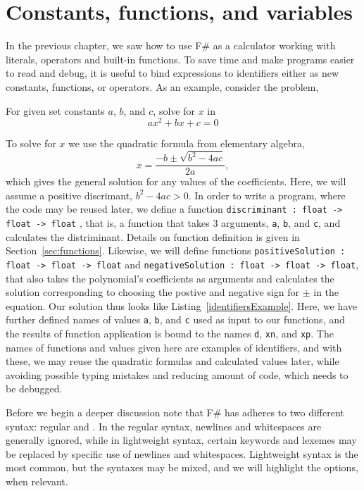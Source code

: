 \chapter{Constants, functions, and variables}
\label{chap:let}
%
In the previous chapter, we saw how to use F\# as a calculator working with literals, operators and built-in functions. To save time and make programs easier to read and debug, it is useful to bind expressions to identifiers either as new constants, functions, or operators. As an example, consider the problem,
\begin{problem}
  For given set constants $a$, $b$, and $c$, solve for $x$ in
  \begin{equation}
  a x^2+bx+c = 0
\end{equation}
\end{problem}
To solve for $x$ we use the quadratic formula from elementary algebra,
\begin{equation}
  x = \frac{-b\pm\sqrt{b^2-4ac}}{2a},
\end{equation}
which gives the general solution for any values of the coefficients. Here, we will assume a positive discrimant, $b^2-4ac>0$. In order to write a program, where the code may be reused later, we define a function \mbox{\lstinline!discriminant : float -> float -> float!}  , that is, a function that takes 3 arguments, \lstinline!a!, \lstinline!b!, and \lstinline!c!, and calculates the distriminant. Details on function definition is given in Section~\ref{sec:functions}. Likewise, we will define functions \mbox{\lstinline!positiveSolution : float -> float -> float!} and \mbox{\lstinline!negativeSolution : float -> float -> float!}, that also takes the polynomial's coefficients as arguments and calculates the solution corresponding to choosing the postive and negative sign for $\pm$ in the equation. Our solution thus looks like Listing~\ref{identifiersExample}.
%
%
Here, we have further defined names of values \lstinline!a!, \lstinline!b!, and \lstinline!c! used as input to our functions, and the results of function application is bound to the names \lstinline!d!, \lstinline!xn!, and \lstinline!xp!. The names of functions and values given here are examples of identifiers, and with these, we may reuse the quadratic formulas and calculated values later, while avoiding possible typing mistakes and reducing amount of code, which needs to be debugged.

Before we begin a deeper discussion note that F\# has adheres to two different syntax: regular and . In the regular syntax, newlines and whitespaces are generally ignored, while in lightweight syntax, certain keywords and lexemes may be replaced by specific use of newlines and whitespaces. Lightweight syntax is the most common, but the syntaxes may be mixed, and we will highlight the options, when relevant.

